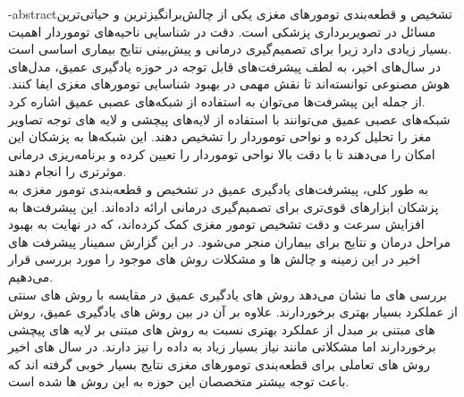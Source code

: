 \fa-abstract{تشخیص و قطعه‌بندی تومورهای مغزی یکی از چالش‌برانگیزترین و حیاتی‌ترین مسائل در تصویربرداری پزشکی است. دقت در شناسایی ناحیه‌های توموردار اهمیت بسیار زیادی دارد زیرا برای تصمیم‌گیری درمانی و پیش‌بینی نتایج بیماری اساسی است.
\\
در سال‌های اخیر، به لطف پیشرفت‌های قابل توجه در حوزه یادگیری عمیق، مدل‌های هوش مصنوعی توانسته‌اند تا نقش مهمی در بهبود شناسایی تومورهای مغزی ایفا کنند. از جمله این پیشرفت‌ها می‌توان به استفاده از شبکه‌های عصبی عمیق اشاره کرد.
\\
شبکه‌های عصبی عمیق می‌توانند با استفاده از لایه‌های پیچشی و لایه های توجه تصاویر مغز را تحلیل کرده و نواحی توموردار را تشخیص دهند. این شبکه‌ها به پزشکان این امکان را می‌دهند تا با دقت بالا نواحی توموردار را تعیین کرده و برنامه‌ریزی درمانی موثرتری را انجام دهند.
\\
به طور کلی، پیشرفت‌های یادگیری عمیق در تشخیص و قطعه‌بندی تومور مغزی به پزشکان ابزارهای قوی‌تری برای تصمیم‌گیری درمانی ارائه داده‌اند. این پیشرفت‌ها به افزایش سرعت و دقت تشخیص تومور مغزی کمک کرده‌اند، که در نهایت به بهبود مراحل درمان و نتایج برای بیماران منجر می‌شود. در این گزارش سمینار پیشرفت های اخیر در این زمینه و چالش ها و مشکلات روش های موجود را مورد بررسی قرار می‌دهیم.
\\
بررسی های ما نشان می‌دهد روش های یادگیری عمیق در مقایسه با روش های سنتی از عملکرد بسیار بهتری برخوردارند. علاوه بر آن در بین روش های یادگیری عمیق، روش های مبتنی بر مبدل از عملکرد بهتری نسبت به روش های مبتنی بر لایه های پیچشی برخوردارند اما مشکلاتی مانند نیاز بسیار زیاد به داده را نیز دارند. در سال های اخیر روش های تعاملی برای قطعه‌بندی تومورهای مغزی نتایج بسیار خوبی گرفته اند که باعث توجه بیشتر متخصصان این حوزه به این روش ها شده است.
}
\abstractPage
\newpage\clearpage